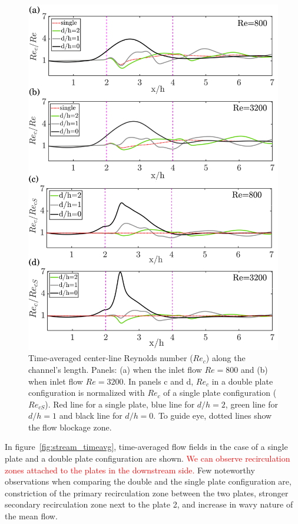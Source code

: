 \documentclass[aps,pre,twocolumn,aps,longbibliography]{revtex4-1}
\begin{document}
	
	\begin{figure}
		\begin{minipage}[c]{1\linewidth}
			\includegraphics[width=1\linewidth]{Fig11.pdf} 
		\end{minipage} 
		\caption{Time-averaged center-line Reynolds number ($Re_c$) along the channel's length. Panels: (a) when the inlet flow $Re=800$ and (b) when inlet flow $Re=3200$. In panels c and d, $Re_c$ in a double plate configuration is normalized with $Re_c$ of a single plate configuration ($Re_{cS}$). Red line for a single plate, blue line for $d/h=2$, green line for $d/h=1$ and black line for $d/h=0$. To guide eye, dotted lines show the flow blockage zone.}
		\label{fig:Vcentre_vs_x}
		\vspace{0cm}
	\end{figure}
	
	
	In figure~\ref{fig:stream_timeavg}, time-averaged flow fields in the case of a single plate and a double plate configuration are shown. \textcolor{red}{We can observe recirculation zones attached to the plates in the downstream side.} Few noteworthy observations when comparing the double and the single plate configuration are, constriction of the primary recirculation zone between the two plates, stronger secondary recirculation zone next to the plate 2, and increase in wavy nature of the mean flow.
	
\end{document}
